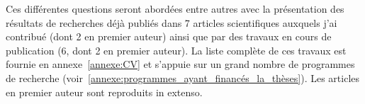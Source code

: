 Ces différentes questions seront abordées entre autres avec la présentation des résultats de
recherches déjà publiés dans 7 articles scientifiques auxquels j'ai contribué (dont 2 
en premier auteur) ainsi que par des travaux en cours de publication (6, dont 2 en premier auteur).
La liste complète de ces travaux est fournie en annexe~\ref{annexe:CV} et s'appuie sur un
grand nombre de programmes de recherche
(voir~\ref{annexe:programmes_ayant_financés_la_thèses}). Les articles en
premier auteur sont reproduits in extenso.
